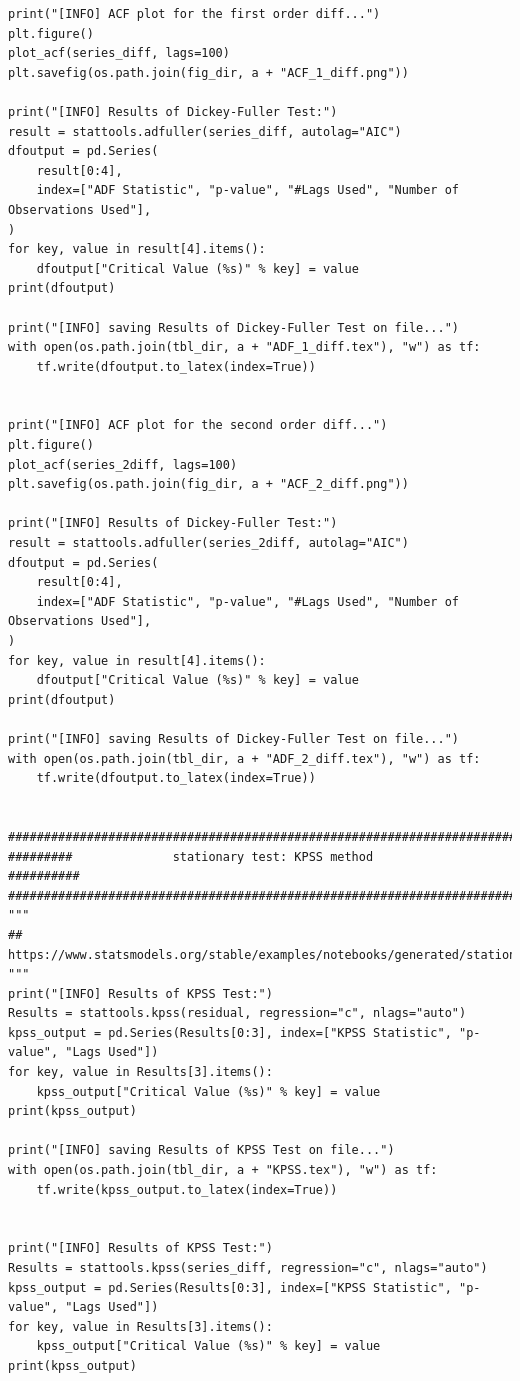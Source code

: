 \documentclass[12pt]{article}
\begin{document}
\begin{lstlisting}
print("[INFO] ACF plot for the first order diff...")
plt.figure()
plot_acf(series_diff, lags=100)
plt.savefig(os.path.join(fig_dir, a + "ACF_1_diff.png"))

print("[INFO] Results of Dickey-Fuller Test:")
result = stattools.adfuller(series_diff, autolag="AIC")
dfoutput = pd.Series(
    result[0:4],
    index=["ADF Statistic", "p-value", "#Lags Used", "Number of Observations Used"],
)
for key, value in result[4].items():
    dfoutput["Critical Value (%s)" % key] = value
print(dfoutput)

print("[INFO] saving Results of Dickey-Fuller Test on file...")
with open(os.path.join(tbl_dir, a + "ADF_1_diff.tex"), "w") as tf:
    tf.write(dfoutput.to_latex(index=True))


print("[INFO] ACF plot for the second order diff...")
plt.figure()
plot_acf(series_2diff, lags=100)
plt.savefig(os.path.join(fig_dir, a + "ACF_2_diff.png"))

print("[INFO] Results of Dickey-Fuller Test:")
result = stattools.adfuller(series_2diff, autolag="AIC")
dfoutput = pd.Series(
    result[0:4],
    index=["ADF Statistic", "p-value", "#Lags Used", "Number of Observations Used"],
)
for key, value in result[4].items():
    dfoutput["Critical Value (%s)" % key] = value
print(dfoutput)

print("[INFO] saving Results of Dickey-Fuller Test on file...")
with open(os.path.join(tbl_dir, a + "ADF_2_diff.tex"), "w") as tf:
    tf.write(dfoutput.to_latex(index=True))


############################################################################
#########              stationary test: KPSS method               ##########
############################################################################
"""
## https://www.statsmodels.org/stable/examples/notebooks/generated/stationarity_detrending_adf_kpss.html
"""
print("[INFO] Results of KPSS Test:")
Results = stattools.kpss(residual, regression="c", nlags="auto")
kpss_output = pd.Series(Results[0:3], index=["KPSS Statistic", "p-value", "Lags Used"])
for key, value in Results[3].items():
    kpss_output["Critical Value (%s)" % key] = value
print(kpss_output)

print("[INFO] saving Results of KPSS Test on file...")
with open(os.path.join(tbl_dir, a + "KPSS.tex"), "w") as tf:
    tf.write(kpss_output.to_latex(index=True))


print("[INFO] Results of KPSS Test:")
Results = stattools.kpss(series_diff, regression="c", nlags="auto")
kpss_output = pd.Series(Results[0:3], index=["KPSS Statistic", "p-value", "Lags Used"])
for key, value in Results[3].items():
    kpss_output["Critical Value (%s)" % key] = value
print(kpss_output)


\end{lstlisting}
\end{document}
